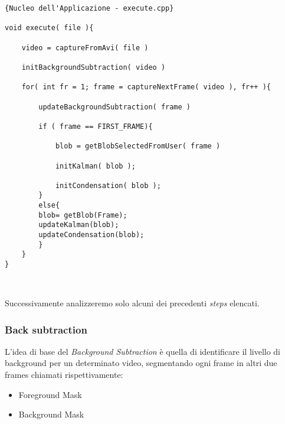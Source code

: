 \lstset{language=c++}
\lstset{commentstyle=\emph}
\begin{lstlisting}[frame=r,caption=Nucleo dell'Applicazione - execute.cpp ,breaklines=true,basicstyle=\small]{Nucleo dell'Applicazione - execute.cpp}

void execute( file ){

	video = captureFromAvi( file )
	
	initBackgroundSubtraction( video )

	for( int fr = 1; frame = captureNextFrame( video ), fr++ ){
	
		updateBackgroundSubtraction( frame )
		
		if ( frame == FIRST_FRAME){
			
			blob = getBlobSelectedFromUser( frame )
	
			initKalman( blob );
			
			initCondensation( blob );
		}
		else{
		blob= getBlob(Frame);
		updateKalman(blob);
		updateCondensation(blob);
		}
	}
}



\end{lstlisting}

Successivamente analizzeremo solo alcuni dei precedenti \textit{steps} elencati.

\subsubsection{Back subtraction}\label{sec:bgsub}
L'idea di base del \textit{Background Subtraction}  è quella di identificare il livello di background per un determinato video, segmentando ogni frame in altri due frames chiamati rispettivamente:

\begin{itemize}
\item Foreground Mask
\item Background Mask
\end{itemize}



